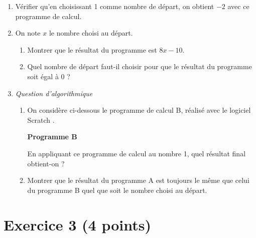 \documentclass[12pt,a4paper,french]{article}
\begin{document}
\begin{enumerate}
	\item Vérifier qu'en choisissant 1 comme nombre de départ, on obtient $-2$ avec ce programme de calcul.

	\item On note $x$ le nombre choisi au départ.
	\begin{enumerate}
		\item Montrer que le résultat du programme est $8x - 10$.

		\item Quel nombre de départ faut-il choisir pour que le résultat du programme soit égal à 0 ?
	\end{enumerate}

	\item \emph{Question d'algorithmique}
	\begin{enumerate}
		\item On considère ci-dessous le programme de calcul B, réalisé avec le logiciel \og Scratch \fg.

		\begin{center}
				\centering \textbf{Programme B}\\[6pt]

				\begin{scratch}
				\end{scratch}
		\end{center}

		En appliquant ce programme de calcul au nombre 1, quel résultat final obtient-on ?

		\item Montrer que le résultat du programme A est toujours le même que celui du programme B quel que soit le nombre choisi au départ.
	\end{enumerate}
\end{enumerate}

\section*{Exercice 3 (4 points)}
\end{document}
